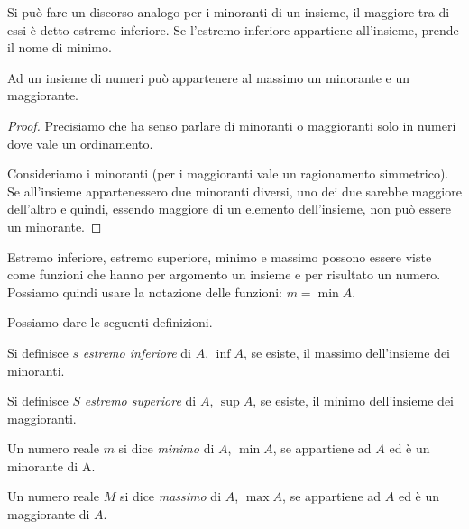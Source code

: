 Si può fare un discorso analogo per i minoranti di un insieme, 
il maggiore tra di essi è detto estremo inferiore. 
Se l'estremo inferiore appartiene all'insieme, prende il nome di minimo. 

\begin{newtheo}{}{}
Ad un insieme di numeri può appartenere al massimo un minorante e un 
maggiorante.
\end{newtheo}
\begin{proof}
Precisiamo che ha senso parlare di minoranti o maggioranti solo in numeri dove 
vale un ordinamento.

Consideriamo i minoranti (per i maggioranti vale un ragionamento simmetrico).
Se all'insieme appartenessero due minoranti diversi, uno dei due sarebbe 
maggiore dell'altro e quindi, essendo maggiore di un elemento dell'insieme, non 
può essere un minorante.
\end{proof}
\begin{newoss}
Estremo inferiore, estremo superiore, minimo e massimo possono essere viste 
come funzioni che hanno per argomento un insieme e per risultato un numero.
Possiamo quindi usare la notazione delle funzioni: \quad \(m = \min{A}\).
\end{newoss}

Possiamo dare le seguenti definizioni.

\begin{newdef}{}{}
Si definisce \(s\) \emph{estremo inferiore} di \(A\), \(\inf{A}\), se esiste, 
il massimo dell'insieme dei minoranti.
\end{newdef}

\begin{newdef}{}{}
Si definisce \(S\) \emph{estremo superiore} di \(A\), \(\sup{A}\), se esiste, 
il minimo dell'insieme dei maggioranti.
\end{newdef}

\begin{newdef}{}{}
Un numero reale \(m\) si dice \emph{minimo} di \(A\), \(\min{A}\), se 
appartiene ad \(A\) ed è un minorante di A.
\end{newdef}

\begin{newdef}{}{}
Un numero reale \(M\) si dice \emph{massimo} di \(A\), \(\max{A}\), se 
appartiene ad \(A\) ed è un maggiorante di \(A\).
\end{newdef}

